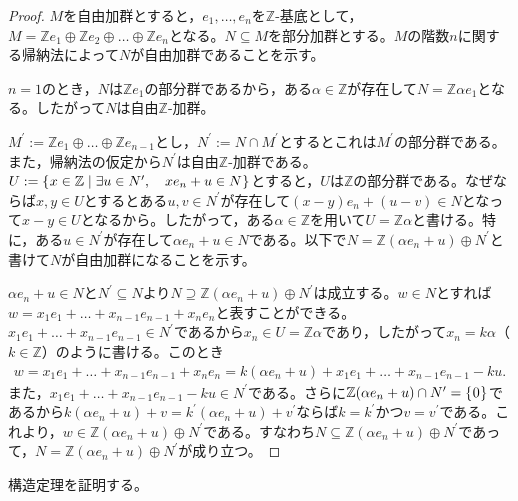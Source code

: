 \documentclass[uplatex]{jsarticle}
\begin{document}
\begin{proof}
  $M$を自由加群とすると，$e_{1}, \dots, e_{n}$を$\mathbb{Z}$-基底として，$M = \mathbb{Z} e_{1} \oplus \mathbb{Z} e_{2} \oplus \dots \oplus \mathbb{Z} e_{n}$となる。$N \subseteq M$を部分加群とする。$M$の階数$n$に関する帰納法によって$N$が自由加群であることを示す。

  $n=1$のとき，$N$は$\mathbb{Z}e_{1}$の部分群であるから，ある$\alpha \in \mathbb{Z}$が存在して$N = \mathbb{Z} \alpha e_{1}$となる。したがって$N$は自由$\mathbb{Z}$-加群。

  $M^{\prime} := \mathbb{Z} e_{1} \oplus \dots \oplus \mathbb{Z} e_{n-1}$とし，$N^{\prime} := N \cap M^{\prime}$とするとこれは$M^{\prime}$の部分群である。また，帰納法の仮定から$N^{\prime}$は自由$\mathbb{Z}$-加群である。
  $U := \Set{\hspace{-1.8pt} x \in \mathbb{Z} | \exists u \in N^{\prime}, \quad x e_{n} + u \in N \hspace{-1.8pt}}$とすると，$U$は$\mathbb{Z}$の部分群である。なぜならば$x, y \in U$とするとある$u, v \in N^{\prime}$が存在して$(x - y)e_{n} + (u - v) \in N$となって$x - y \in U$となるから。したがって，ある$\alpha \in \mathbb{Z}$を用いて$U = \mathbb{Z} \alpha$と書ける。特に，ある$u \in N^{\prime}$が存在して$\alpha e_{n} + u \in N$である。以下で$N = \mathbb{Z}(\alpha e_{n} + u) \oplus N^{\prime}$と書けて$N$が自由加群になることを示す。

  $\alpha e_{n} + u \in N$と$N^{\prime} \subseteq N$より$N \supseteq \mathbb{Z}(\alpha e_{n} + u) \oplus N^{\prime}$は成立する。$w \in N$とすれば$w = x_{1}e_{1} + \dots + x_{n-1}e_{n-1} + x_{n}e_{n}$と表すことができる。$x_{1}e_{1} + \dots + x_{n-1}e_{n-1} \in N^{\prime}$であるから$x_{n} \in U = \mathbb{Z} \alpha$であり，したがって$x_{n} = k \alpha$（$k \in \mathbb{Z}$）のように書ける。このとき
  \begin{align}
    w = x_{1}e_{1} + \dots + x_{n-1}e_{n-1} + x_{n}e_{n} = k (\alpha e_{n} + u) + x_{1}e_{1} + \dots + x_{n-1}e_{n-1} - ku.
  \end{align}
  また，$x_{1}e_{1} + \dots + x_{n-1}e_{n-1} - ku \in N^{\prime}$である。さらに$\mathbb{Z}(\alpha e_{n} + u) \cap N^{\prime} = \Set{\hspace{-1.8pt} 0 \hspace{-1.8pt}}$であるから$k(\alpha e_{n} + u) + v = k^{\prime} (\alpha e_{n} + u) + v^{\prime}$ならば$k = k^{\prime}$かつ$v = v^{\prime}$である。これより，$w \in \mathbb{Z}(\alpha e_{n} + u) \oplus N^{\prime}$である。すなわち$N \subseteq \mathbb{Z}(\alpha e_{n} + u) \oplus N^{\prime}$であって，$N = \mathbb{Z}(\alpha e_{n} + u) \oplus N^{\prime}$が成り立つ。
\end{proof}

構造定理を証明する。
\end{document}
